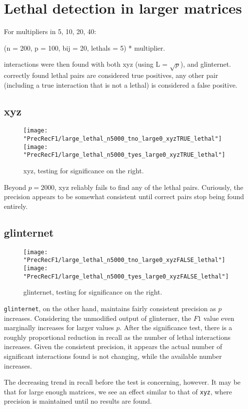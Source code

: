 \documentclass{article}
\begin{document}
\section{Lethal detection in larger matrices}
For multipliers in 5, 10, 20, 40:

(n = 200, p = 100, bij = 20, lethals = 5) * multiplier.

interactions were then found with both xyz (using L = $\sqrt{p}$), and glinternet. correctly found lethal pairs are considered true positives, any other pair (including a true interaction that is not a lethal) is considered a false positive.
\subsection{xyz}
\begin{figure}[H]
\begin{minipage}{\linewidth}
	\centering
	\texttt{[image: "PrecRecF1/large\_lethal\_n5000\_tno\_large0\_xyzTRUE\_lethal"]}%
	\texttt{[image: "PrecRecF1/large\_lethal\_n5000\_tyes\_large0\_xyzTRUE\_lethal"]}
\end{minipage}
\caption{xyz, testing for significance on the right.}
\end{figure}

Beyond $p = 2000$, xyz reliably fails to find any of the lethal pairs. Curiously, the precision appears to be somewhat consistent until correct pairs stop being found entirely.

\subsection{glinternet}
\begin{figure}[H]
\begin{minipage}{\linewidth}
	\centering
	\texttt{[image: "PrecRecF1/large\_lethal\_n5000\_tno\_large0\_xyzFALSE\_lethal"]}%
	\texttt{[image: "PrecRecF1/large\_lethal\_n5000\_tyes\_large0\_xyzFALSE\_lethal"]}
\end{minipage}
\caption{glinternet, testing for significance on the right.}
\end{figure}
\verb|glinternet|, on the other hand, maintains fairly consistent precision as $p$ increases. Considering the unmodified output of glinterner, the $F1$ value even marginally increases for larger values $p$. After the significance test, there is a roughly proportional reduction in recall as the number of lethal interactions increases. Given the consistent precision, it appears the actual number of significant interactions found is not changing, while the available number increases.

The decreasing trend in recall before the test is concerning, however. It may be that for large enough matrices, we see an effect similar to that of \verb|xyz|, where precision is maintained until no results are found.
\end{document}
